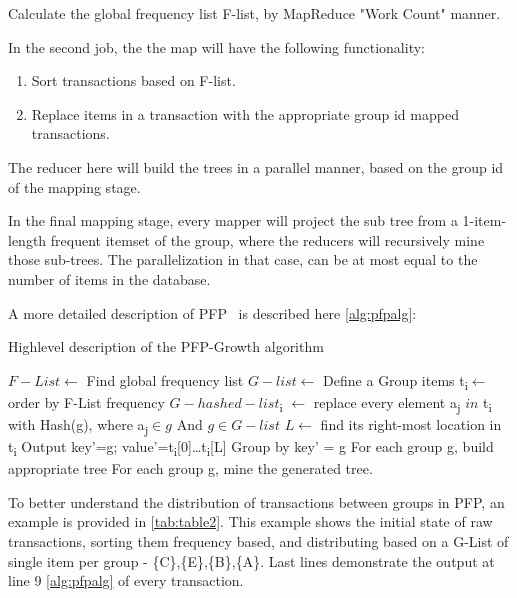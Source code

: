 \begin{steps}
\item Calculate the global frequency list F-list, by MapReduce "Work Count" manner.
\item In the second job, the the map will have the following functionality:
\begin{enumerate}
\item Sort transactions based on F-list.
\item Replace items in a transaction with the appropriate group id mapped transactions.
\end{enumerate}
	The reducer here will build the trees in a parallel manner, based on the group id of the mapping stage.
\item In the final mapping stage, every mapper will project the sub tree from a 1-item-length frequent itemset of the group, where the reducers will recursively mine those sub-trees. The parallelization in that case, can be at most equal to the number of items in the database.
\end{steps}

A more detailed description of PFP~\cite{li2008pfp} is described here \autoref{alg:pfpalg}:
\begin{algorithm}
  \caption{Highlevel description of the PFP-Growth algorithm}\label{euclid}
  \begin{algorithmic}[1]
   \label{alg:pfpalg}
      \State $F-List\gets$ Find global frequency list
      \State $G-list\gets$ Define a Group items
        \State t\textsubscript{i}$\gets$ order by F-List frequency
		\State $G-hashed-list$\textsubscript{i} $\gets$ replace every element a\textsubscript{j} $in$ t\textsubscript{i} with Hash(g), where a\textsubscript{j}$\in g$ And $g\in G-list$
      		\State $L\gets$ find its right-most location in t\textsubscript{i}
      		\State Output key'=g; value'={t\textsubscript{i}[0]…t\textsubscript{i}[L]}
      	\EndFor
      \EndFor
 	\State Group by key' = g
 	\State For each group g, build appropriate tree
 	\State For each group g, mine the generated tree.
    \EndProcedure
  \end{algorithmic}
\end{algorithm}


To better understand the distribution of transactions between groups in PFP, an example is provided in \autoref{tab:table2}. This example shows the initial state of raw transactions, sorting them frequency based, and distributing based on a G-List of single item per group - \{C\},\{E\},\{B\},\{A\}. Last lines demonstrate the output at line 9 \autoref{alg:pfpalg} of every transaction. 

